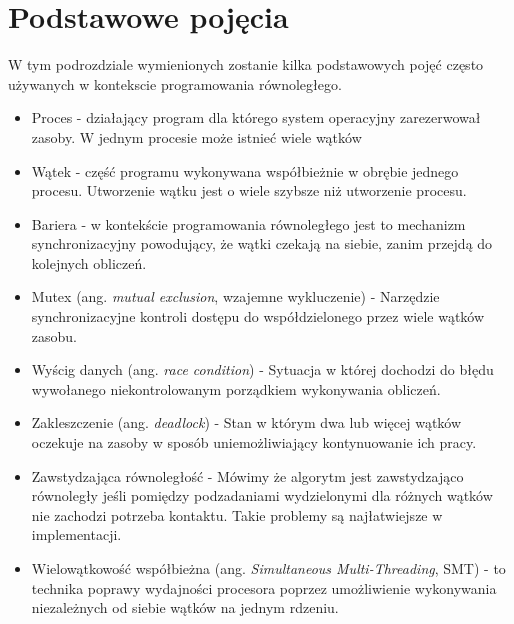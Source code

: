 \documentclass[a4paper,12pt]{book} %
\begin{document}
\section{Podstawowe pojęcia}
W tym podrozdziale wymienionych zostanie kilka podstawowych pojęć często używanych w kontekscie programowania równoległego.
\begin{itemize}
\item Proces - działający program dla którego system operacyjny zarezerwował zasoby. W jednym procesie może istnieć wiele wątków
\item Wątek - część programu wykonywana współbieżnie w obrębie jednego procesu. Utworzenie wątku jest o wiele szybsze niż utworzenie procesu.
\item Bariera - w kontekście programowania równoległego jest to mechanizm synchronizacyjny powodujący, że wątki czekają na siebie, zanim przejdą do kolejnych obliczeń.
\item Mutex (ang. \emph{mutual exclusion}, wzajemne wykluczenie) - Narzędzie synchronizacyjne kontroli dostępu do współdzielonego przez wiele wątków zasobu.
\item Wyścig danych (ang. \emph{race condition}) - Sytuacja w której dochodzi do błędu wywołanego niekontrolowanym porządkiem wykonywania obliczeń.
\item Zakleszczenie (ang. \emph{deadlock}) - Stan w którym dwa lub więcej wątków oczekuje na zasoby w sposób uniemożliwiający kontynuowanie ich pracy.
\item Zawstydzająca równoległość - Mówimy że algorytm jest zawstydzająco równoległy jeśli pomiędzy podzadaniami wydzielonymi dla różnych wątków nie zachodzi potrzeba kontaktu. Takie problemy są najłatwiejsze w implementacji.
\item Wielowątkowość współbieżna (ang. \emph{Simultaneous Multi-Threading}, SMT) - to technika poprawy wydajności procesora poprzez umożliwienie wykonywania niezależnych od siebie wątków na jednym rdzeniu.
\end{itemize}
\end{document}
